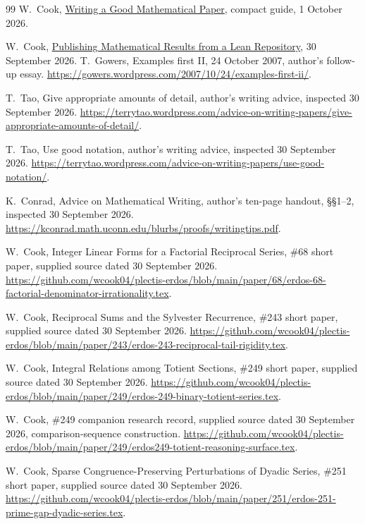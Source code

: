 \begin{thebibliography}{99}
W.~Cook, \href{https://github.com/wcook04/plectis-erdos/blob/main/paper/exposition/writing-a-good-mathematical-paper.pdf}{Writing a Good Mathematical Paper},
compact guide, 1 October 2026.

W.~Cook, \href{https://github.com/wcook04/plectis-erdos/blob/main/paper/systems/claim-faithful-publication-systems-paper.tex}{Publishing Mathematical Results from a Lean
Repository}, 30 September 2026.
T.~Gowers, Examples first II, 24 October 2007, author's follow-up essay.
\url{https://gowers.wordpress.com/2007/10/24/examples-first-ii/}.

T.~Tao, Give appropriate amounts of detail, author's writing advice,
inspected 30 September 2026.
\url{https://terrytao.wordpress.com/advice-on-writing-papers/give-appropriate-amounts-of-detail/}.

T.~Tao, Use good notation, author's writing advice,
inspected 30 September 2026.
\url{https://terrytao.wordpress.com/advice-on-writing-papers/use-good-notation/}.

K.~Conrad, Advice on Mathematical Writing, author's ten-page handout,
\S\S1--2, inspected 30 September 2026.
\url{https://kconrad.math.uconn.edu/blurbs/proofs/writingtips.pdf}.

W.~Cook, Integer Linear Forms for a Factorial Reciprocal Series,
\#68 short paper, supplied source dated 30 September 2026.
\url{https://github.com/wcook04/plectis-erdos/blob/main/paper/68/erdos-68-factorial-denominator-irrationality.tex}.

W.~Cook, Reciprocal Sums and the Sylvester Recurrence,
\#243 short paper, supplied source dated 30 September 2026.
\url{https://github.com/wcook04/plectis-erdos/blob/main/paper/243/erdos-243-reciprocal-tail-rigidity.tex}.

W.~Cook, Integral Relations among Totient Sections,
\#249 short paper, supplied source dated 30 September 2026.
\url{https://github.com/wcook04/plectis-erdos/blob/main/paper/249/erdos-249-binary-totient-series.tex}.

W.~Cook, \#249 companion research record, supplied source dated
30 September 2026, comparison-sequence construction.
\url{https://github.com/wcook04/plectis-erdos/blob/main/paper/249/erdos249-totient-reasoning-surface.tex}.

W.~Cook, Sparse Congruence-Preserving Perturbations of Dyadic Series,
\#251 short paper, supplied source dated 30 September 2026.
\url{https://github.com/wcook04/plectis-erdos/blob/main/paper/251/erdos-251-prime-gap-dyadic-series.tex}.


\end{thebibliography}
